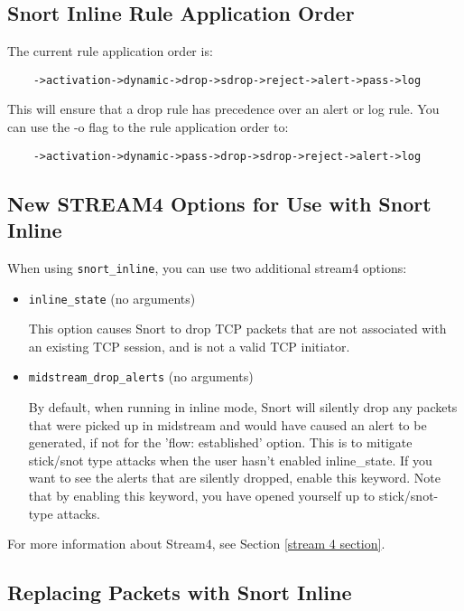 \documentclass[english]{report}
\begin{document}
\subsection{Snort Inline Rule Application Order\label{InlineRuleOrder}}

The current rule application order is: 
\begin{verbatim}
	->activation->dynamic->drop->sdrop->reject->alert->pass->log
\end{verbatim}
This will ensure that a drop rule has precedence over an alert or log rule.
You can use the -o flag to the rule application order to:
\begin{verbatim}
	->activation->dynamic->pass->drop->sdrop->reject->alert->log
\end{verbatim}

\subsection{New STREAM4 Options for Use with Snort Inline\label{Stream4Inline}}

When using \texttt{snort\_inline}, you can use two additional stream4 options:

\begin{itemize}
\item \texttt{inline\_state} (no arguments)
   
   This option causes Snort to drop TCP packets that are not associated with 
    an existing TCP session, and is not a valid TCP initiator.

\item \texttt{midstream\_drop\_alerts} (no arguments)
   
   By default, when running in inline mode, Snort will silently drop any
    packets that were picked up in midstream and would have caused an alert
    to be generated, if not for the 'flow: established' option.  This is to
    mitigate stick/snot type attacks when the user hasn't enabled 
    inline\_state.  If you want to see the alerts that are silently
    dropped, enable this keyword.  Note that by enabling this keyword,
    you have opened yourself up to stick/snot-type attacks.

\end{itemize}

For more information about Stream4, see Section \ref{stream 4 section}.

\subsection{Replacing Packets with Snort Inline\label{ReplaceInline}}
\end{document}
